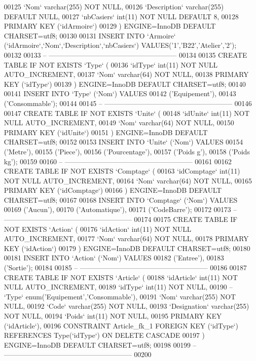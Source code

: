 \begin{DoxyCode}
00125   `Nom` varchar(255) NOT NULL,
00126   `Description` varchar(255) DEFAULT NULL,
00127   `nbCasiers` int(11) NOT NULL DEFAULT 8,
00128   PRIMARY KEY (`idArmoire`)
00129 ) ENGINE=InnoDB DEFAULT CHARSET=utf8;
00130 
00131 INSERT INTO `Armoire` (`idArmoire`,`Nom`,`Description`,`nbCasiers`) VALUES('1','B22','Atelier','2');
00132 
00133 -- --------------------------------------------------------
00134 
00135 CREATE TABLE IF NOT EXISTS `Type` (
00136   `idType` int(11) NOT NULL AUTO\_INCREMENT,
00137   `Nom` varchar(64) NOT NULL,
00138   PRIMARY KEY (`idType`)
00139 ) ENGINE=InnoDB DEFAULT CHARSET=utf8;
00140 
00141 INSERT INTO `Type` (`Nom`) VALUES
00142 ('Equipement'),
00143 ('Consommable');
00144 
00145 -- --------------------------------------------------------
00146 
00147 CREATE TABLE IF NOT EXISTS `Unite` (
00148   `idUnite` int(11) NOT NULL AUTO\_INCREMENT,
00149   `Nom` varchar(64) NOT NULL,
00150   PRIMARY KEY (`idUnite`)
00151 ) ENGINE=InnoDB DEFAULT CHARSET=utf8;
00152 
00153 INSERT INTO `Unite` (`Nom`) VALUES
00154 ('Metre'),
00155 ('Piece'),
00156 ('Pourcentage'),
00157 ('Poids g'),
00158 ('Poids kg');
00159 
00160 -- --------------------------------------------------------
00161 
00162 CREATE TABLE IF NOT EXISTS `Comptage` (
00163   `idComptage` int(11) NOT NULL AUTO\_INCREMENT,
00164   `Nom` varchar(64) NOT NULL,
00165   PRIMARY KEY (`idComptage`)
00166 ) ENGINE=InnoDB DEFAULT CHARSET=utf8;
00167 
00168 INSERT INTO `Comptage` (`Nom`) VALUES
00169 ('Aucun'),
00170 ('Automatique'),
00171 ('CodeBarre');
00172 
00173 -- --------------------------------------------------------
00174 
00175 CREATE TABLE IF NOT EXISTS `Action` (
00176   `idAction` int(11) NOT NULL AUTO\_INCREMENT,
00177   `Nom` varchar(64) NOT NULL,
00178   PRIMARY KEY (`idAction`)
00179 ) ENGINE=InnoDB DEFAULT CHARSET=utf8;
00180 
00181 INSERT INTO `Action` (`Nom`) VALUES
00182 ('Entree'),
00183 ('Sortie');
00184 
00185 -- --------------------------------------------------------
00186 
00187 CREATE TABLE IF NOT EXISTS `Article` (
00188   `idArticle` int(11) NOT NULL AUTO\_INCREMENT,
00189   `idType` int(11) NOT NULL,  
00190   --   `Type` enum('Equipement','Consommable'),
00191   `Nom` varchar(255) NOT NULL,
00192   `Code` varchar(255) NOT NULL,
00193   `Designation` varchar(255) NOT NULL,
00194   `Poids` int(11) NOT NULL,  
00195   PRIMARY KEY (`idArticle`),
00196   CONSTRAINT Article\_fk\_1 FOREIGN KEY (`idType`) REFERENCES Type(`idType`) ON DELETE CASCADE
00197 ) ENGINE=InnoDB DEFAULT CHARSET=utf8;
00198 
00199 -- --------------------------------------------------------
00200 

\end{DoxyCode}
